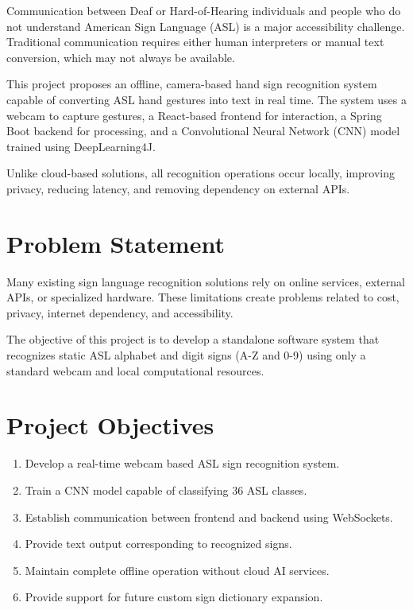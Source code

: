 \documentclass[11pt,a4paper]{report}
\begin{document}
Communication between Deaf or Hard-of-Hearing individuals and people who do not understand American Sign Language (ASL) is a major accessibility challenge. Traditional communication requires either human interpreters or manual text conversion, which may not always be available.

This project proposes an offline, camera-based hand sign recognition system capable of converting ASL hand gestures into text in real time. The system uses a webcam to capture gestures, a React-based frontend for interaction, a Spring Boot backend for processing, and a Convolutional Neural Network (CNN) model trained using DeepLearning4J.

Unlike cloud-based solutions, all recognition operations occur locally, improving privacy, reducing latency, and removing dependency on external APIs.

\section{Problem Statement}

Many existing sign language recognition solutions rely on online services, external APIs, or specialized hardware. These limitations create problems related to cost, privacy, internet dependency, and accessibility.

The objective of this project is to develop a standalone software system that recognizes static ASL alphabet and digit signs (A-Z and 0-9) using only a standard webcam and local computational resources.

\section{Project Objectives}

\begin{enumerate}
\item Develop a real-time webcam based ASL sign recognition system.
\item Train a CNN model capable of classifying 36 ASL classes.
\item Establish communication between frontend and backend using WebSockets.
\item Provide text output corresponding to recognized signs.
\item Maintain complete offline operation without cloud AI services.
\item Provide support for future custom sign dictionary expansion.
\end{enumerate}
\end{document}
